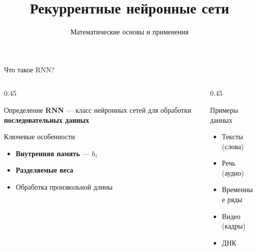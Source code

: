 \documentclass[aspectratio=169, 10pt]{beamer}
\title{Рекуррентные нейронные сети}
\subtitle{Математические основы и применения}
\author{}
\date{}
\begin{document}
\begin{frame}[plain]
  \titlepage
\end{frame}

\begin{frame}{Что такое RNN?}
  \begin{columns}[T]
    \begin{column}{0.45\textwidth}
      \begin{block}{Определение}
        \textbf{RNN} — класс нейронных сетей для обработки \textbf{последовательных данных}
      \end{block}
      
      \vspace{0.2cm}
      
      \begin{block}{Ключевые особенности}
        \begin{itemize}
          \item \textbf{Внутренняя память} — $h_t$           \item \textbf{Разделяемые веса}
          \item Обработка произвольной длины
        \end{itemize}
      \end{block}
    \end{column}
    
    \begin{column}{0.45\textwidth}
      \begin{block}{Примеры данных}
        \begin{itemize}
          \item Тексты (слова)
          \item Речь (аудио)
          \item Временные ряды
          \item Видео (кадры)
          \item ДНК
        \end{itemize}
      \end{block}
    \end{column}
  \end{columns}
\end{frame}
\end{document}
